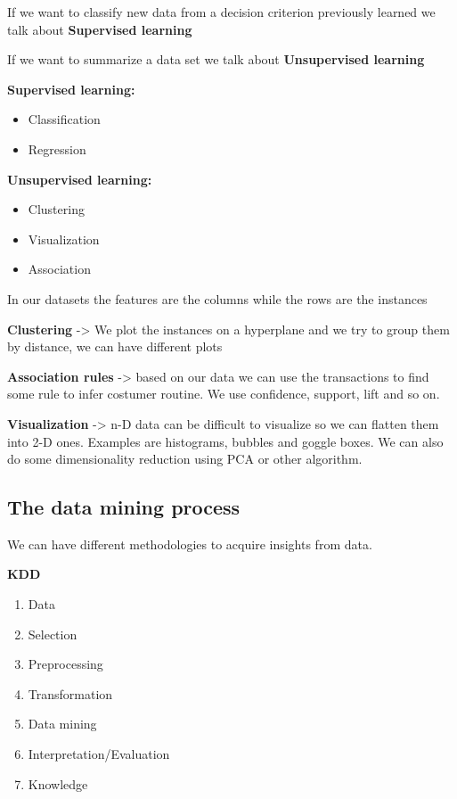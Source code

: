 If we want to classify new data from a decision criterion previously learned we talk about \textbf{Supervised learning}

\vspace{10pt}

If we want to summarize a data set we talk about \textbf{Unsupervised learning}

\vspace{10pt}

\textbf{Supervised learning:}
\begin{itemize}
    \item Classification
    \item Regression
\end{itemize}

\textbf{Unsupervised learning:}
\begin{itemize}
    \item Clustering
    \item Visualization
    \item Association
\end{itemize}

\vspace{20pt}

In our datasets the features are the columns while the rows are the instances

\vspace{20pt}

\textbf{Clustering} -> We plot the instances on a hyperplane and we try to group them by distance, we can have different plots 

\textbf{Association rules} -> based on our data we can use the transactions to find some rule to infer costumer routine. We use confidence, support, lift and so on.

\textbf{Visualization} -> n-D data can be difficult to visualize so we can flatten them into 2-D ones. Examples are histograms, bubbles and goggle boxes. We can also do some dimensionality reduction using PCA or other algorithm.

\subsection{The data mining process}


We can have different methodologies to acquire insights from data.

\vspace{10pt}

\textbf{KDD}
\begin{enumerate}
    \item Data
    \item Selection
    \item Preprocessing
    \item Transformation
    \item Data mining
    \item Interpretation/Evaluation
    \item Knowledge  
\end{enumerate}

